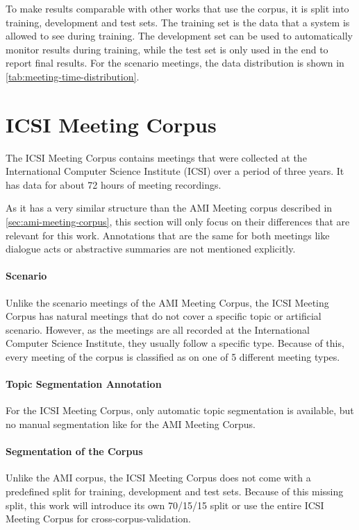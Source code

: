 To make results comparable with other works that use the corpus, it is split into training, development and test sets.
The training set is the data that a system is allowed to see during training.
The development set can be used to automatically monitor results during training, while the test set is only used in the end to report final results.
For the scenario meetings, the data distribution is shown in \cref{tab:meeting-time-distribution}. \cite{amiWebsite}


\section{ICSI Meeting Corpus}\label{sec:icsi-corpus}

The ICSI Meeting Corpus contains meetings that were collected at the International Computer Science Institute (ICSI) over a period of three years.
It has data for about 72 hours of meeting recordings. \cite{Janin}

As it has a very similar structure than the AMI Meeting corpus described in \cref{sec:ami-meeting-corpus}, this section will only focus on their differences that are relevant for this work.
Annotations that are the same for both meetings like dialogue acts or abstractive summaries are not mentioned explicitly.

\paragraph{Scenario}

Unlike the scenario meetings of the AMI Meeting Corpus, the ICSI Meeting Corpus has natural meetings that do not cover a specific topic or artificial scenario.
However, as the meetings are all recorded at the International Computer Science Institute, they usually follow a specific type.
Because of this, every meeting of the corpus is classified as on one of 5 different meeting types. \cite{Janin}

\paragraph{Topic Segmentation Annotation}

For the ICSI Meeting Corpus, only automatic topic segmentation is available, but no manual segmentation like for the AMI Meeting Corpus.

\paragraph{Segmentation of the Corpus}

Unlike the AMI corpus, the ICSI Meeting Corpus does not come with a predefined split for training, development and test sets.
Because of this missing split, this work will introduce its own 70/15/15 split or use the entire ICSI Meeting Corpus for cross-corpus-validation.